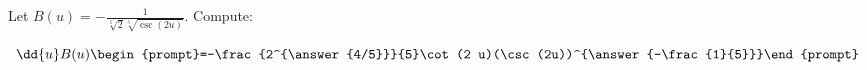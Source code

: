 \documentclass{ximera}
\author{Bart Snapp}
\begin{document}
\begin{exercise}
Let $B(u) = -\frac{1}{\sqrt[5]{2} \sqrt[5]{\csc (2 u)}}$. Compute:

\[
\dd{u}B(u)
\begin{prompt}=-\frac{2^{\answer{4/5}}}{5}\cot (2 u)(\csc(2u))^{\answer{-\frac{1}{5}}}\end{prompt}
\]
\end{exercise}
\end{document}
